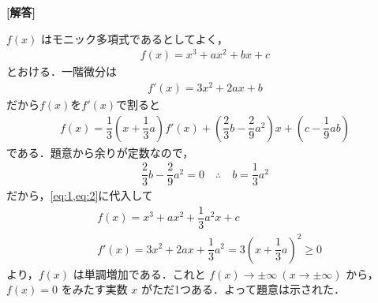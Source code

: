 \documentclass[../../main.tex]{subfiles}
\begin{document}
\begin{oframed}
  
\end{oframed}

{\bf [解答]}

$f(x)$ はモニック多項式であるとしてよく，
\begin{align}
  f(x) = x^3 + ax^2 + bx + c \label{eq:1}
\end{align}
とおける．一階微分は
\begin{align}
  f'(x) = 3x^2 + 2ax + b \label{eq:2}
\end{align}
だから$f(x)$を$f'(x)$で割ると
\begin{align}
  f(x) = \dfrac{1}{3}\left(x + \dfrac{1}{3}a\right)f'(x) + \left(\dfrac{2}{3}b - \dfrac{2}{9}a^2\right)x + \left(c - \dfrac{1}{9}ab\right)
\end{align}
である．題意から余りが定数なので，
\begin{align}
  \dfrac{2}{3}b - \dfrac{2}{9}a^2 = 0
  \quad \therefore
  \quad b = \dfrac{1}{3}a^2
\end{align}
だから，\cref{eq:1,eq:2}に代入して
\begin{align}
  & f(x) = x^3 + ax^2 + \dfrac{1}{3}a^2 x + c \\
  & f'(x) = 3x^2 + 2ax + \dfrac{1}{3}a^2 = 3\left(x + \dfrac{1}{3}a\right)^2 \ge 0
\end{align}
より，$f(x)$ は単調増加である．これと $f(x) \to \pm\infty \ (x \to \pm\infty)$ から，$f(x) = 0$ をみたす実数 $x$ がただ1つある．よって題意は示された．
\end{document}
